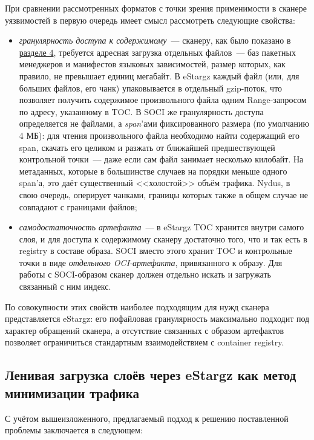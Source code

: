 При сравнении рассмотренных форматов с точки зрения применимости в сканере уязвимостей в первую очередь имеет смысл рассмотреть следующие свойства:

\begin{itemize}
\item \textit{гранулярность доступа к содержимому}~--- сканеру, как было показано в \hyperref[sec:Chapter3]{разделе 4}, требуется адресная загрузка отдельных файлов~--- баз пакетных менеджеров и манифестов языковых зависимостей, размер которых, как правило, не превышает единиц мегабайт. В eStargz каждый файл (или, для больших файлов, его чанк) упаковывается в отдельный gzip-поток, что позволяет получить содержимое произвольного файла одним Range-запросом по адресу, указанному в TOC. В SOCI же гранулярность доступа определяется не файлами, а \textit{span}'ами фиксированного размера (по умолчанию 4 МБ): для чтения произвольного файла необходимо найти содержащий его span, скачать его целиком и разжать от ближайшей предшествующей контрольной точки~--- даже если сам файл занимает несколько килобайт. На метаданных, которые в большинстве случаев на порядки меньше одного span'а, это даёт существенный <<холостой>> объём трафика. Nydus, в свою очередь, оперирует чанками, границы которых также в общем случае не совпадают с границами файлов;

\item \textit{самодостаточность артефакта}~--- в eStargz TOC хранится внутри самого слоя, и для доступа к содержимому сканеру достаточно того, что и так есть в registry в составе образа. SOCI вместо этого хранит TOC и контрольные точки в виде \textit{отдельного OCI-артефакта}, привязанного к образу. Для работы с SOCI-образом сканер должен отдельно искать и загружать связанный с ним индекс.
\end{itemize}

По совокупности этих свойств наиболее подходящим для нужд сканера представляется eStargz: его пофайловая гранулярность максимально подходит под характер обращений сканера, а отсутствие связанных с образом артефактов позволяет ограничиться стандартным взаимодействием с container registry.

\subsection{Ленивая загрузка слоёв через eStargz как метод минимизации трафика}

С учётом вышеизложенного, предлагаемый подход к решению поставленной проблемы заключается в следующем:

